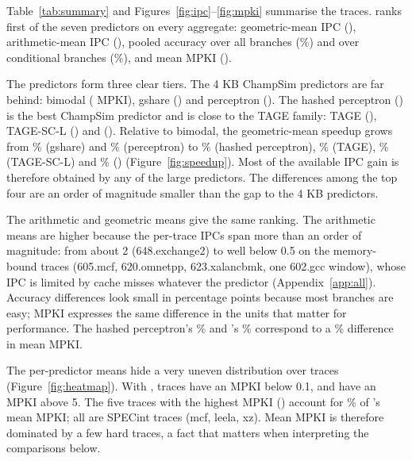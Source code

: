 Table~\ref{tab:summary} and Figures~\ref{fig:ipc}--\ref{fig:mpki} summarise the  traces. \prop{} ranks first of the seven predictors on every aggregate: geometric-mean IPC (), arithmetic-mean IPC (), pooled accuracy over all branches (\%) and over conditional branches (\%), and mean MPKI ().

The predictors form three clear tiers. The 4 KB ChampSim predictors are far behind: bimodal ( MPKI), gshare () and perceptron (). The hashed perceptron () is the best ChampSim predictor and is close to the TAGE family: TAGE (), TAGE-SC-L () and \prop{} (). Relative to bimodal, the geometric-mean speedup grows from \% (gshare) and \% (perceptron) to \% (hashed perceptron), \% (TAGE), \% (TAGE-SC-L) and \% (\prop{}) (Figure~\ref{fig:speedup}). Most of the available IPC gain is therefore obtained by any of the large predictors. The differences among the top four are an order of magnitude smaller than the gap to the 4 KB predictors.

The arithmetic and geometric means give the same ranking. The arithmetic means are higher because the per-trace IPCs span more than an order of magnitude: from about 2 (648.exchange2) to well below 0.5 on the memory-bound traces (605.mcf, 620.omnetpp, 623.xalancbmk, one 602.gcc window), whose IPC is limited by cache misses whatever the predictor (Appendix~\ref{app:all}). Accuracy differences look small in percentage points because most branches are easy; MPKI expresses the same difference in the units that matter for performance. The hashed perceptron's \% and \prop{}'s \% correspond to a \% difference in mean MPKI.

The per-predictor means hide a very uneven distribution over traces (Figure~\ref{fig:heatmap}). With \prop{},  traces have an MPKI below 0.1, and  have an MPKI above 5. The five traces with the highest MPKI () account for \% of \prop{}'s mean MPKI; all are SPECint traces (mcf, leela, xz). Mean MPKI is therefore dominated by a few hard traces, a fact that matters when interpreting the comparisons below.
